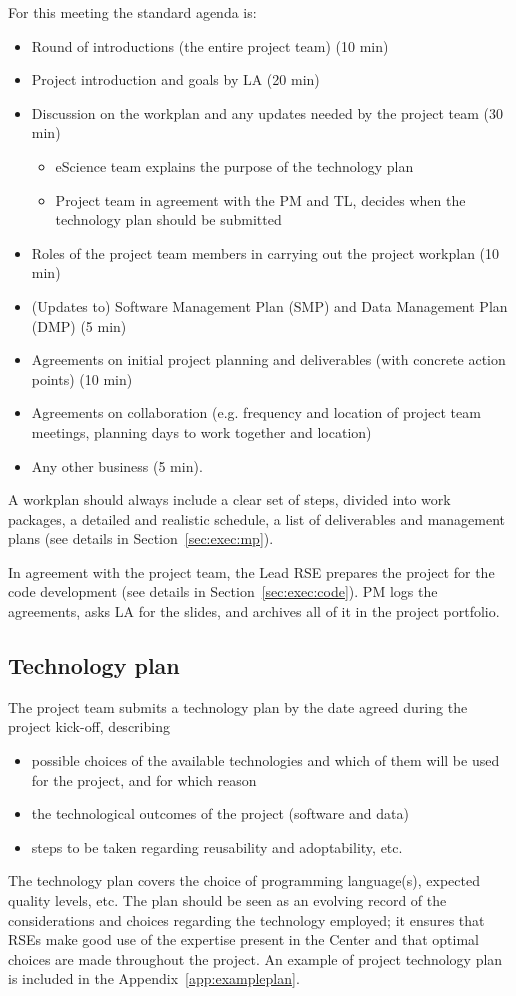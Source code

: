 \documentclass[11pt]{article}
\begin{document}
For this meeting the standard agenda is:
\begin{itemize}
\item Round of introductions (the entire project team) (10 min)
\item Project introduction and goals by LA (20 min)
\item Discussion on the workplan and any updates needed by the project team (30 min)
\begin{itemize}
\item eScience team explains the purpose of the technology plan
\item Project team in agreement with the PM and TL, decides when the technology plan should be submitted
\end{itemize}
\item Roles of the project team members in carrying out the project workplan (10 min)
\item (Updates to) Software Management Plan (SMP) and Data Management Plan (DMP) (5 min)
\item Agreements on initial project planning and deliverables (with concrete action points) (10 min)
\item Agreements on collaboration (e.g. frequency and location of project team meetings, planning days to work together and
location)
\item Any other business (5 min).
\end{itemize}

A workplan should always include a clear set of steps, divided into work packages, a detailed and realistic schedule, a
list of deliverables and management plans (see details in Section~\ref{sec:exec:mp}).

In agreement with the project team, the Lead RSE prepares the project for the code development (see details in Section~\ref{sec:exec:code}). PM logs the agreements, asks LA for the slides, and archives all of it in the project
portfolio.


\subsection{Technology plan}
\label{sec:init:techplan}

The project team submits a technology plan by the date agreed during the project kick-off, describing
\begin{itemize}
\item possible choices of the available technologies and which of them will be used for the project, and for which reason
\item the technological outcomes of the project (software and data) 
\item steps to be taken regarding reusability and adoptability, etc. 
\end{itemize}
The technology plan covers the choice of programming language(s), expected quality levels, etc. The plan should be seen
as an evolving record of the considerations and choices regarding the technology employed; it ensures that RSEs make
good use of the expertise present in the Center and that optimal choices are made throughout the project. An example of
project technology plan is included in the Appendix~\ref{app:exampleplan}.
\end{document}

